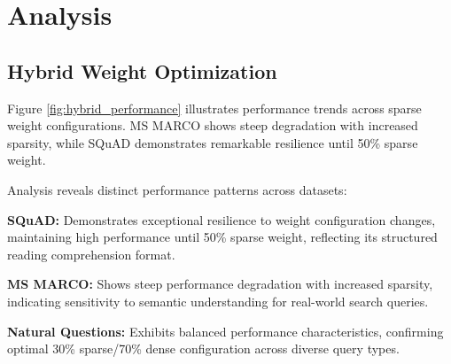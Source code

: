 \documentclass[11pt]{article}
\begin{document}
\section{Analysis}

\subsection{Hybrid Weight Optimization}

Figure \ref{fig:hybrid_performance} illustrates performance trends across sparse weight configurations. MS MARCO shows steep degradation with increased sparsity, while SQuAD demonstrates remarkable resilience until 50\% sparse weight.

Analysis reveals distinct performance patterns across datasets:

\textbf{SQuAD:} Demonstrates exceptional resilience to weight configuration changes, maintaining high performance until 50\% sparse weight, reflecting its structured reading comprehension format.

\textbf{MS MARCO:} Shows steep performance degradation with increased sparsity, indicating sensitivity to semantic understanding for real-world search queries.

\textbf{Natural Questions:} Exhibits balanced performance characteristics, confirming optimal 30\% sparse/70\% dense configuration across diverse query types.
\end{document}
